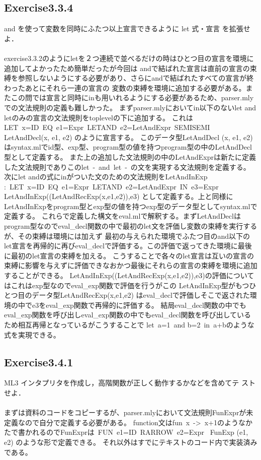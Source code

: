 \documentclass[a4paper,11pt,oneside,openany]{jsarticle}
\begin{document}
\subsection{Exercise3.3.4}
    and を使って変数を同時にふたつ以上宣言できるように let 式・宣言 を拡張せよ．\\\\
    exercise3.3.2のようにletを２つ連続で並べるだけの時はひとつ目の宣言を環境に追加してよかったため簡単だったが今回は
    andで結ばれた宣言は直前の宣言の束縛を参照しないようにする必要があり、さらにandで結ばれたすべての宣言が終わったあとにそれら一連の宣言の
    変数の束縛を環境に追加する必要がある。またこの問では宣言と同時にinも用いれるようにする必要があるため、parser.mlyでの文法規則の定義も難しかった。
    まずparser.mlyにおいてin以下のないlet and letのみの宣言の文法規則をtoplevelの下に追加する。
    これはLET\ x=ID\ EQ\ e1=Expr\ LETAND\ e2=LetAndExpr\ SEMISEMI\ { LetAndDecl(x, e1, e2) }のように宣言する。
    このデータ型LetAndDecl (x, e1, e2)はsyntax.mlでid型、exp型、program型の値を持つprogram型の中のLetAndDecl型として定義する。
    また上の追加した文法規則の中のLetAndExprは新たに定義した文法規則でありこのlet\ -\ and\ let\ -\ の文を実現する文法規則を定義する。
    次にlet andの式にinがついた文のための文法規則をLetAndInExp :\ LET\ x=ID\ EQ\ e1=Expr\ LETAND\ e2=LetAndExpr\ IN\ e3=Expr\ { LetAndInExp((LetAndRecExp(x,e1,e2)),e3) }
    として定義する。上と同様にLetAndInExpをprogram型とexp型の値を持つexp型のデータ型としてsyntax.mlで定義する。
    これらで定義した構文をeval.mlで解釈する。まずLetAndDeclはprogram型なのでeval_decl関数の中で最初のlet文を評価し変数の束縛を実行するが、その束縛は環境には加えず
    最初の与えられた環境でふたつ目のand以下のlet宣言を再帰的に再びeval_declで評価する。この評価で返ってきた環境に最後に最初のlet宣言の束縛を加える。
    こうすることで各々のlet宣言は互いの宣言の束縛に影響を与えずに評価できなおかつ最後にそれらの宣言の束縛を環境に追加することができる。
    LetAndInExp((LetAndRecExp(x,e1,e2)),e3)の評価についてはこれはexp型なのでeval_exp関数で評価を行うがこの LetAndInExp型がもつひとつ目のデータ型LetAndRecExp(x,e1,e2)
    はeval_declで評価しそこで返された環境の中でe3をeval_exp関数で再帰的に評価する。
    結局eval_decl関数の中でもeval_exp関数を呼び出しeval_exp関数の中でもeval_decl関数を呼び出しているため相互再帰となっているがこうすることで
    let\ a=1\ and b=2\ in\ a+bのような式を実現できる。
    


\subsection{Exercise3.4.1}
    ML3 インタプリタを作成し，高階関数が正しく動作するかなどを含めてテ ストせよ．\\\\
    まずは資料のコードをコピーするが、parser.mlyにおいて文法規則FunExprが未定義なので自分で定義する必要がある。
    function文はfun\ x\ ->\ x+1のようなかたで書かれるのでFunExprは\ FUN\ e1=ID\ RARROW\ e2=Expr\ { FunExp (e1, e2) }のような形で定義できる。
    それ以外はすでにテキストのコード内で実装済みである。
\end{document}

